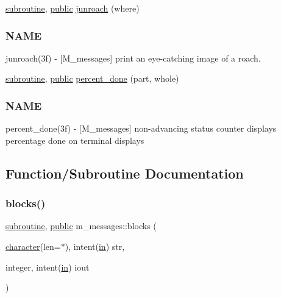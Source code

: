\begin{DoxyCompactItemize}
\item 
\hyperlink{M__stopwatch_83_8txt_acfbcff50169d691ff02d4a123ed70482}{subroutine}, \hyperlink{M__stopwatch_83_8txt_a2f74811300c361e53b430611a7d1769f}{public} \hyperlink{namespacem__messages_a986ae6ab4c767cfedb3e8eb2894224db}{junroach} (where)
\begin{DoxyCompactList}\small\item\em \subsubsection*{N\+A\+ME}

junroach(3f) -\/ \mbox{[}M\+\_\+messages\mbox{]} print an eye-\/catching image of a roach. \end{DoxyCompactList}\item 
\hyperlink{M__stopwatch_83_8txt_acfbcff50169d691ff02d4a123ed70482}{subroutine}, \hyperlink{M__stopwatch_83_8txt_a2f74811300c361e53b430611a7d1769f}{public} \hyperlink{namespacem__messages_a94db4939f1beef711a49d603ba383943}{percent\+\_\+done} (part, whole)
\begin{DoxyCompactList}\small\item\em \subsubsection*{N\+A\+ME}

percent\+\_\+done(3f) -\/ \mbox{[}M\+\_\+messages\mbox{]} non-\/advancing status counter displays percentage done on terminal displays \end{DoxyCompactList}\end{DoxyCompactItemize}



\subsection{Function/\+Subroutine Documentation}
\mbox{\label{namespacem__messages_a91d3a2ecf1ca4868fdd9f18720a13136}} 
\subsubsection{\texorpdfstring{blocks()}{blocks()}}
{\footnotesize\ttfamily \hyperlink{M__stopwatch_83_8txt_acfbcff50169d691ff02d4a123ed70482}{subroutine}, \hyperlink{M__stopwatch_83_8txt_a2f74811300c361e53b430611a7d1769f}{public} m\+\_\+messages\+::blocks (\begin{DoxyParamCaption}\item[{\hyperlink{option__stopwatch_83_8txt_abd4b21fbbd175834027b5224bfe97e66}{character}(len=$\ast$), intent(\hyperlink{M__journal_83_8txt_afce72651d1eed785a2132bee863b2f38}{in})}]{str,  }\item[{integer, intent(\hyperlink{M__journal_83_8txt_afce72651d1eed785a2132bee863b2f38}{in})}]{iout }\end{DoxyParamCaption})}



